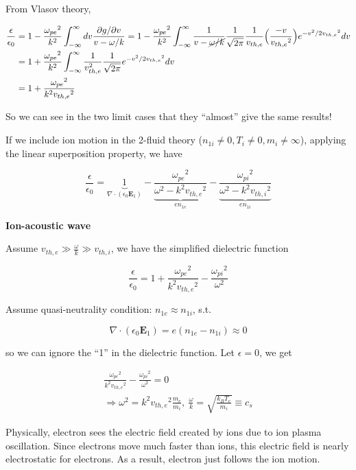 \documentclass[
  notoc %
]{tufte-book}
\begin{document}
From Vlasov theory,

\[
\begin{aligned}
\frac{\epsilon}{\epsilon_0}&=1-\frac{{\omega_{pe}}^2}{k^2}\int_{-\infty}^{\infty}dv\frac{\partial g/\partial v}{v-\omega/k}=
1-\frac{{\omega_{pe}}^2}{k^2}\int_{-\infty}^{\infty}\frac{1}{v-\cancel{\omega/k}}\frac{1}{\sqrt{2\pi}}\frac{1}{v_{th,e}}\Big(\frac{-v}{{v_{th,e}}^2} \Big) e^{-v^2/2{v_{th,e}}^2}dv  \\
&=1+\frac{{\omega_{pe}}^2}{k^2}\int_{-\infty}^{\infty}\frac{1}{v_{th,e}^2}\frac{1}{\sqrt{2\pi}} e^{-v^2/2{v_{th,e}}^2}dv \\
&=1+\frac{{\omega_{pe}}^2}{k^2{v_{th,e}}^2}
\end{aligned}
\]

So we can see in the two limit cases that they ``almost'' give the same
results!

If we include ion motion in the 2-fluid theory
(\(n_{1i}\neq0, T_i\neq0,m_i\neq\infty\)), applying the linear
superposition property, we have

\[
\frac{\epsilon}{\epsilon_0}=\underbrace{1}_{\nabla\cdot(\epsilon_0\mathbf{E}_1)}-\underbrace{\frac{{\omega_{pe}}^2}{\omega^2-k^2{v_{th,e}}^2}}_{en_{1e}}-\underbrace{\frac{{\omega_{pi}}^2}{\omega^2-k^2{v_{th,i}}^2}}_{en_{1i}}
\]

\textbf{Ion-acoustic wave}

Assume \(v_{th,e}\gg \frac{\omega}{k}\gg v_{th,i}\), we have the
simplified dielectric function

\[
\frac{\epsilon}{\epsilon_0}=1+\frac{{\omega_{pe}}^2}{k^2{v_{th,e}}^2}-\frac{{\omega_{pi}}^2}{\omega^2}
\]

Assume quasi-neutrality condition: \(n_{1e}\approx n_{1i}\), s.t.

\[
\nabla\cdot(\epsilon_0\mathbf{E}_1)=e(n_{1e}-n_{1i})\approx 0
\]

so we can ignore the ``1'' in the dielectric function. Let
\(\epsilon=0\), we get

\[
\begin{aligned}
\frac{{\omega_{pe}}^2}{k^2{v_{th,e}}^2}-\frac{{\omega_{pi}}^2}{\omega^2}=0 \\
\Rightarrow \omega^2=k^2{v_{th,e}}^2\frac{m_e}{m_i},\ \frac{\omega}{k}=\sqrt{\frac{k_BT_e}{m_i}}\equiv c_s
\end{aligned}
\]

Physically, electron sees the electric field created by ions due to ion
plasma oscillation. Since electrons move much faster than ions, this
electric field is nearly electrostatic for electrons. As a result,
electron just follows the ion motion.
\end{document}
